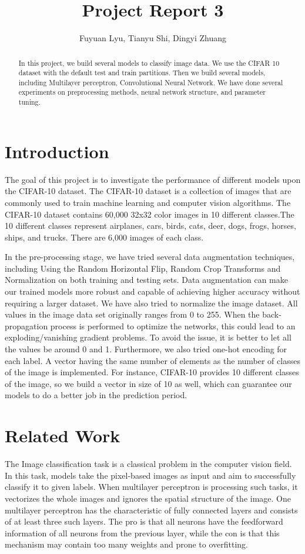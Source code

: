 \documentclass[11pt]{scrartcl}
\title{Project Report 3}
\author{Fuyuan Lyu, Tianyu Shi, Dingyi Zhuang}
\begin{document}
\maketitle

\begin{abstract}
In this project, we build several models to classify image data. We use the CIFAR 10 dataset with the default test and train partitions.
Then we build several models, including Multilayer perceptron, Convolutional Neural Network. We have done several experiments on preprocessing methods, neural network structure, and parameter tuning.
\end{abstract}
  
\section{Introduction}
The goal of this project is to investigate the performance of different models upon the CIFAR-10 dataset. The CIFAR-10 dataset is a collection of images that are commonly used to train machine learning and computer vision algorithms. The CIFAR-10 dataset contains 60,000 32x32 color images in 10 different classes.The 10 different classes represent airplanes, cars, birds, cats, deer, dogs, frogs, horses, ships, and trucks. There are 6,000 images of each class.

In the pre-processing stage, we have tried several data augmentation techniques, including Using the Random Horizontal Flip, Random Crop Transforms and Normalization on both training and testing sets. Data augmentation can make our trained models more robust and capable of achieving higher accuracy without requiring a larger dataset.
We have also tried to normalize the image dataset. All values in the image data set originally ranges from 0 to 255. When the back-propagation process is performed to optimize the networks, this could lead to an exploding/vanishing gradient problems. To avoid the issue, it is better to let all the values be around 0 and 1.
Furthermore, we also tried one-hot encoding for each label. A vector having the same number of elements as the number of classes of the image is implemented. For instance, CIFAR-10 provides 10 different classes of the image, so we build a vector in size of 10 as well, which can guarantee our models to do a better job in the prediction period.



\section{Related Work}
The Image classification task is a classical problem in the computer vision field. In this task, models take the pixel-based images as input and aim to successfully classify it to given labels. When multilayer perceptron is processing such tasks, it vectorizes the whole images and ignores the spatial structure of the image. One multilayer perceptron has the characteristic of fully connected layers and consists of at least three such layers. The pro is that all neurons have the feedforward information of all neurons from the previous layer, while the con is that this mechanism may contain too many weights and prone to overfitting.
\end{document}

